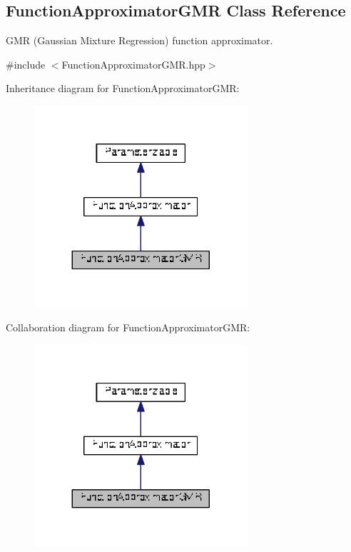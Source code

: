 \hypertarget{classDmpBbo_1_1FunctionApproximatorGMR}{\subsection{Function\+Approximator\+G\+M\+R Class Reference}
\label{classDmpBbo_1_1FunctionApproximatorGMR}
}


G\+M\+R (Gaussian Mixture Regression) function approximator.  




{\ttfamily \#include $<$Function\+Approximator\+G\+M\+R.\+hpp$>$}



Inheritance diagram for Function\+Approximator\+G\+M\+R\+:
\nopagebreak
\begin{figure}[H]
\begin{center}
\leavevmode
\includegraphics[width=224pt]{classDmpBbo_1_1FunctionApproximatorGMR__inherit__graph}
\end{center}
\end{figure}


Collaboration diagram for Function\+Approximator\+G\+M\+R\+:
\nopagebreak
\begin{figure}[H]
\begin{center}
\leavevmode
\includegraphics[width=224pt]{classDmpBbo_1_1FunctionApproximatorGMR__coll__graph}
\end{center}
\end{figure}

